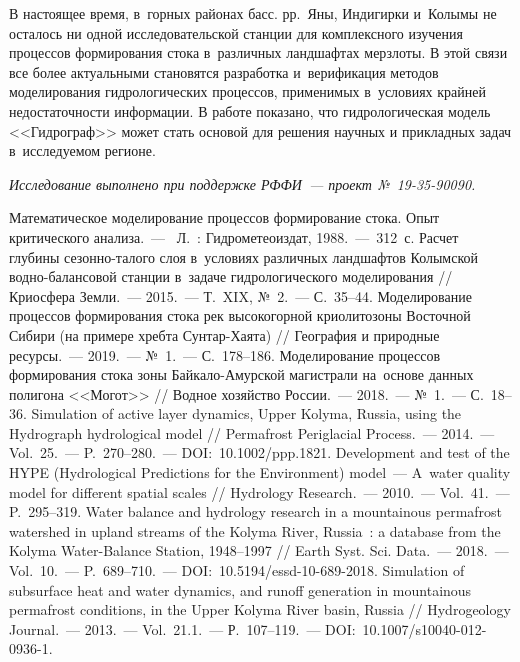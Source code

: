 В настоящее время, в~горных районах басс. рр.~Яны, Индигирки и~Колымы не осталось ни одной исследовательской станции для комплексного изучения процессов формирования стока в~различных ландшафтах мерзлоты. В этой связи все более актуальными становятся разработка и~верификация методов моделирования гидрологических процессов, применимых в~условиях крайней недостаточности информации. В работе показано, что гидрологическая модель <<Гидрограф>> может стать основой для решения научных и прикладных задач в~исследуемом регионе.

\textit{Исследование выполнено при поддержке РФФИ~--- проект №~19-35-90090.}

\begin{thebibliography}{99}
\bibitem{} Математическое моделирование процессов формирование стока. Опыт критического анализа.~---  Л.~: Гидрометеоиздат, 1988.~--- 312~с.
\bibitem{} Расчет глубины сезонно-талого слоя в~условиях различных ландшафтов Колымской водно-балансовой станции в~задаче гидрологического моделирования // Криосфера Земли.~--- 2015.~--- Т.~XIX, №~2.~--- С.~35--44.
\bibitem{} Моделирование процессов формирования стока рек высокогорной криолитозоны Восточной Сибири (на примере хребта Сунтар-Хаята) // География и природные ресурсы.~--- 2019.~--- №~1.~--- С.~178--186.
\bibitem{} Моделирование процессов формирования стока зоны Байкало-Амурской магистрали на~основе данных полигона <<Могот>> // Водное хозяйство России.~--- 2018.~--- №~1.~--- С.~18--36.
\bibitem{} Simulation of active layer dynamics, Upper Kolyma, Russia, using the Hydrograph hydrological model // Permafrost Periglacial Process.~--- 2014.~--- Vol.~25.~--- P.~270--280.~--- DOI:~10.1002/ppp.1821.
\bibitem{} Development and test of the HYPE (Hydrological Predictions for the Environment) model~--- A~water quality model for different spatial scales // Hydrology Research.~--- 2010.~--- Vol.~41.~--- P.~295--319.
\bibitem{} Water balance and hydrology research in a mountainous permafrost watershed in upland streams of the Kolyma River, Russia~: a database from the Kolyma Water-Balance Station, 1948--1997 // Earth Syst. Sci. Data.~--- 2018.~--- Vol.~10.~--- P.~689--710.~--- DOI:~10.5194/essd-10-689-2018.
\bibitem{} Simulation of subsurface heat and water dynamics, and runoff generation in mountainous permafrost conditions, in the Upper Kolyma River basin, Russia // Hydrogeology Journal.~--- 2013.~--- Vol.~21.1.~--- Р.~107--119.~--- DOI:~10.1007/s10040-012-0936-1.

\end{thebibliography}

